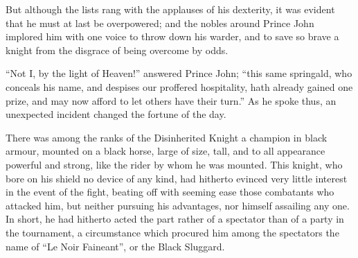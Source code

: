 But although the lists rang with the applauses of his dexterity, it was
evident that he must at last be overpowered; and the nobles around
Prince John implored him with one voice to throw down his warder, and to
save so brave a knight from the disgrace of being overcome by odds.

``Not I, by the light of Heaven!'' answered Prince John; ``this same
springald, who conceals his name, and despises our proffered
hospitality, hath already gained one prize, and may now afford to let
others have their turn.'' As he spoke thus, an unexpected incident
changed the fortune of the day.

There was among the ranks of the Disinherited Knight a champion in black
armour, mounted on a black horse, large of size, tall, and to all
appearance powerful and strong, like the rider by whom he was mounted.
This knight, who bore on his shield no device of any kind, had hitherto
evinced very little interest in the event of the fight, beating off with
seeming ease those combatants who attacked him, but neither pursuing his
advantages, nor himself assailing any one. In short, he had hitherto
acted the part rather of a spectator than of a party in the tournament,
a circumstance which procured him among the spectators the name of ``Le
Noir Faineant'', or the Black Sluggard.

